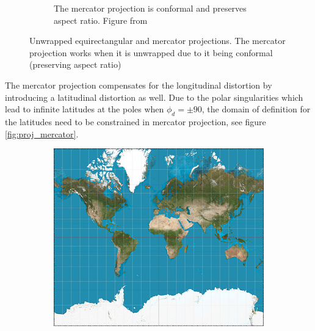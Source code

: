 \begin{figure}[htbp]
\begin{subfigure}[t]{0.3\textwidth}
        \caption{The mercator projection is conformal and preserves aspect ratio. Figure from \cite{worldimagery}}
    \end{subfigure}
    \caption{Unwrapped equirectangular and mercator projections. The mercator projection works when it is unwrapped due to it being conformal (preserving aspect ratio)}
    \label{fig:mercator}
\end{figure}

The mercator projection compensates for the longitudinal distortion by introducing a latitudinal distortion as well. Due to the polar singularities which lead to infinite latitudes at the poles when $\phi_d = \pm 90$, the domain of definition for the latitudes need to be constrained in mercator projection, see figure \ref{fig:proj_mercator}.

\begin{figure}[htbp]
    \centering
    \begin{subfigure}[bt]{0.4\textwidth}
        \includegraphics[width=\textwidth]{figures/developable_projected/mercator.png}
    \end{subfigure}
    \qquad
    \begin{subfigure}[bt]{0.15\textwidth}

\end{subfigure}
\end{figure}
